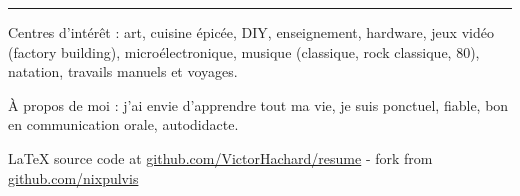 \documentclass[10pt,letterpaper]{article}
\newcommand{\latex}{\LaTeX\xspace}
\newenvironment{indentsection}[1]
{\begin{list}{}
  {\setlength{\leftmargin}{#1}} \item[]
}
{\end{list}}
\begin{document}
\hrule
\begin{indentsection}{\parindent}
\begin{description*}
\item[Centres d'intérêt :]
  art, cuisine épicée, DIY, enseignement, hardware, jeux vidéo (factory building),
  microélectronique, musique (classique, rock classique, 80), natation, travails
  manuels et voyages. 
\item[À propos de moi :]
  j'ai envie d'apprendre tout ma vie, je suis ponctuel, fiable,
  bon en communication orale, autodidacte.
\end{description*}
\end{indentsection}


\begin{center}
\footnotesize \latex source code at
\href{http://www.github.com/VictorHachard/resume}
{github.com/VictorHachard/resume} - fork from
\href{http://www.github.com/nixpulvis}
{github.com/nixpulvis}
\end{center}
\end{document}
